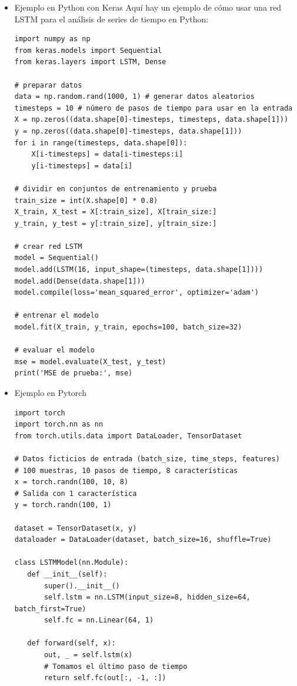 \documentclass[11pt]{article}
\begin{document}
\begin{itemize}
\item Ejemplo en Python con Keras
\label{sec:orgbde5daa}
Aquí hay un ejemplo de cómo usar una red LSTM para el análisis de
series de tiempo en Python:
\begin{verbatim}
import numpy as np
from keras.models import Sequential
from keras.layers import LSTM, Dense

# preparar datos
data = np.random.rand(1000, 1) # generar datos aleatorios
timesteps = 10 # número de pasos de tiempo para usar en la entrada
X = np.zeros((data.shape[0]-timesteps, timesteps, data.shape[1]))
y = np.zeros((data.shape[0]-timesteps, data.shape[1]))
for i in range(timesteps, data.shape[0]):
    X[i-timesteps] = data[i-timesteps:i]
    y[i-timesteps] = data[i]

# dividir en conjuntos de entrenamiento y prueba
train_size = int(X.shape[0] * 0.8)
X_train, X_test = X[:train_size], X[train_size:]
y_train, y_test = y[:train_size], y[train_size:]

# crear red LSTM
model = Sequential()
model.add(LSTM(16, input_shape=(timesteps, data.shape[1])))
model.add(Dense(data.shape[1]))
model.compile(loss='mean_squared_error', optimizer='adam')

# entrenar el modelo
model.fit(X_train, y_train, epochs=100, batch_size=32)

# evaluar el modelo
mse = model.evaluate(X_test, y_test)
print('MSE de prueba:', mse)
\end{verbatim}

\item Ejemplo en Pytorch
\label{sec:org301b06f}
\begin{verbatim}
import torch
import torch.nn as nn
from torch.utils.data import DataLoader, TensorDataset

# Datos ficticios de entrada (batch_size, time_steps, features)
# 100 muestras, 10 pasos de tiempo, 8 características
x = torch.randn(100, 10, 8)
# Salida con 1 característica
y = torch.randn(100, 1)

dataset = TensorDataset(x, y)
dataloader = DataLoader(dataset, batch_size=16, shuffle=True)

class LSTMModel(nn.Module):
   def __init__(self):
       super().__init__()
       self.lstm = nn.LSTM(input_size=8, hidden_size=64, batch_first=True)
       self.fc = nn.Linear(64, 1)

   def forward(self, x):
       out, _ = self.lstm(x)
       # Tomamos el último paso de tiempo
       return self.fc(out[:, -1, :])


\end{verbatim}
\end{itemize}
\end{document}
